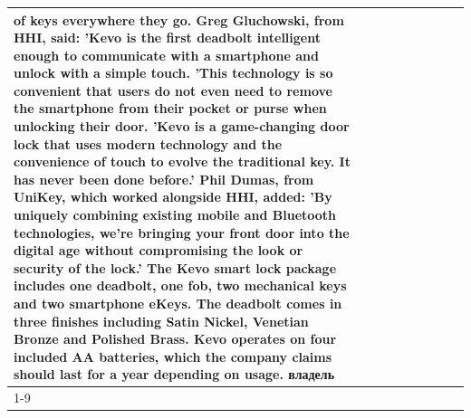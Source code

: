 \begin{table}[H]
\begin{tabular}{lllrlllll}
of keys everywhere they go. Greg Gluchowski, from HHI, said: 'Kevo is the first deadbolt intelligent enough to communicate with a smartphone and unlock with a simple touch. 'This technology is so convenient that users do not even need to remove the smartphone from their pocket or purse when unlocking their door. 'Kevo is a game-changing door lock that uses modern technology and the convenience of touch to evolve the traditional key. It has never been done before.' Phil Dumas, from UniKey, which worked alongside HHI, added: 'By uniquely combining existing mobile and Bluetooth technologies, we’re bringing your front door into the digital age without compromising the look or security of the lock.' The Kevo smart lock package includes one deadbolt, one fob, two mechanical keys and two smartphone eKeys. The deadbolt comes in three finishes including Satin Nickel, Venetian Bronze and Polished Brass. Kevo operates on four included AA batteries, which the company claims should last for a year depending on usage. владель \\
\cline{1-9}

\end{tabular}
\end{table}
